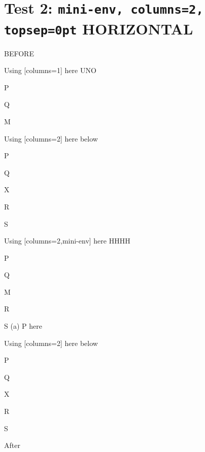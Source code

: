 \documentclass[10pt]{article}
\begin{document}
\section{Test 2: \texttt{mini-env, columns=2, topsep=0pt} HORIZONTAL}

BEFORE
\begin{enumext}[columns=2,parsep=1cm]
\item Using [columns=1] here UNO
  \begin{enumext}[columns=1,topsep=0pt,partopsep=10pt]%
     \item  P \item Q \item M %
  \end{enumext}

\item Using [columns=2] here below
\begin{enumext}[columns=2]%
     \item  P \item Q \item X  \item R \item S
  \end{enumext}

\columnbreak

\item Using [columns=2,mini-env] here HHHH
  \begin{enumext}[columns=2,mini-env={0.4\linewidth},topsep=0pt,partopsep=10pt]%
    \item  P \item Q \item M \item R \item S
    \miniright
    (a) P here
  \end{enumext}

\item Using [columns=2] here below
\begin{enumext}[columns=2]%
     \item  P \item Q \item X  \item R \item S
  \end{enumext}

\end{enumext}
After
\end{document}
